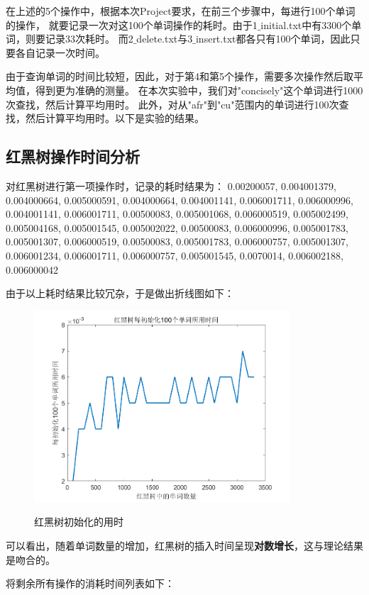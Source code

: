 \documentclass{article}
\begin{document}
在上述的5个操作中，根据本次Project要求，在前三个步骤中，每进行100个单词的操作，
就要记录一次对这100个单词操作的耗时。由于1$\_$initial.txt中有3300个单词，则要记录33次耗时。
而2$\_$delete.txt与3$\_$insert.txt都各只有100个单词，因此只要各自记录一次时间。

由于查询单词的时间比较短，因此，对于第4和第5个操作，需要多次操作然后取平均值，得到更为准确的测量。
在本次实验中，我们对"concisely"这个单词进行1000次查找，然后计算平均用时。
此外，对从"afr"到"cu"范围内的单词进行100次查找，然后计算平均用时。以下是实验的结果。


\subsection{红黑树操作时间分析}
对红黑树进行第一项操作时，记录的耗时结果为：
0.00200057, 0.004001379, 0.004000664, 0.005000591,
0.004000664, 0.004001141, 0.006001711, 
0.006000996, 0.004001141, 0.006001711, 
0.00500083, 0.005001068, 0.006000519, 0.005002499, 
0.005004168, 0.005001545, 0.005002022, 0.00500083, 
0.006000996, 0.005001783, 0.005001307, 
0.006000519, 0.00500083, 0.005001783, 0.006000757, 
0.005001307, 0.006001234, 0.006001711, 
0.006000757, 0.005001545, 0.0070014, 0.006002188, 
0.006000042

由于以上耗时结果比较冗杂，于是做出折线图如下：
\begin{figure}[H]
	\centering
	{\includegraphics[width=0.85\textwidth]{时间图像绘制/rbTree_init.png}} 
	\caption{红黑树初始化的用时}
\end{figure}

可以看出，随着单词数量的增加，红黑树的插入时间呈现\textbf{对数增长}，这与理论结果是吻合的。

将剩余所有操作的消耗时间列表如下：
\end{document}
